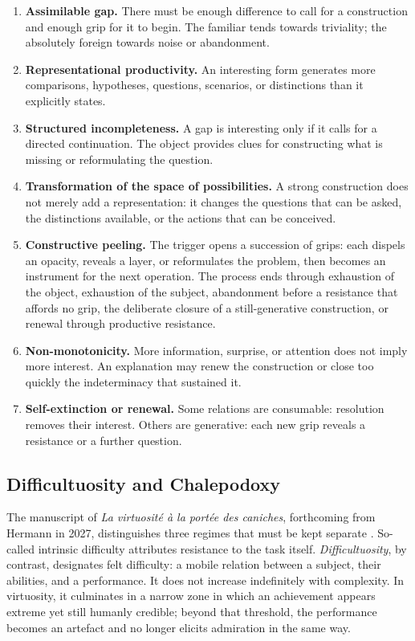\documentclass[11pt,a4paper]{article}
\begin{document}
\begin{enumerate}[resume]
  \item \textbf{Assimilable gap.} There must be enough difference to call for a
        construction and enough grip for it to begin. The familiar tends
        towards triviality; the absolutely foreign towards noise or
        abandonment.
  \item \textbf{Representational productivity.} An interesting form generates
        more comparisons, hypotheses, questions, scenarios, or distinctions
        than it explicitly states.
  \item \textbf{Structured incompleteness.} A gap is interesting only if it
        calls for a directed continuation. The object provides clues for
        constructing what is missing or reformulating the question.
  \item \textbf{Transformation of the space of possibilities.} A strong
        construction does not merely add a representation: it changes the
        questions that can be asked, the distinctions available, or the actions
        that can be conceived.
  \item \textbf{Constructive peeling.} The trigger opens a succession of
        grips: each dispels an opacity, reveals a layer, or reformulates the
        problem, then becomes an instrument for the next operation. The process
        ends through exhaustion of the object, exhaustion of the subject,
        abandonment before a resistance that affords no grip, the deliberate
        closure of a still-generative construction, or renewal through
        productive resistance.
  \item \textbf{Non-monotonicity.} More information, surprise, or attention does
        not imply more interest. An explanation may renew the construction or
        close too quickly the indeterminacy that sustained it.
  \item \textbf{Self-extinction or renewal.} Some relations are consumable:
        resolution removes their interest. Others are generative: each new grip
        reveals a resistance or a further question.
\end{enumerate}

\subsection{Difficultuosity and Chalepodoxy}

The manuscript of \emph{La virtuosité à la portée des caniches}, forthcoming
from Hermann in 2027, distinguishes three regimes that must be kept separate
\parencite[manuscript, 13--16]{pachet2027virtuosite}. So-called intrinsic
difficulty attributes resistance to the task itself. \emph{Difficultuosity}, by
contrast, designates felt difficulty: a mobile relation between a subject,
their abilities, and a performance. It does not increase indefinitely with
complexity. In virtuosity, it culminates in a narrow zone in which an
achievement appears extreme yet still humanly credible; beyond that threshold,
the performance becomes an artefact and no longer elicits admiration in the
same way.
\end{document}
